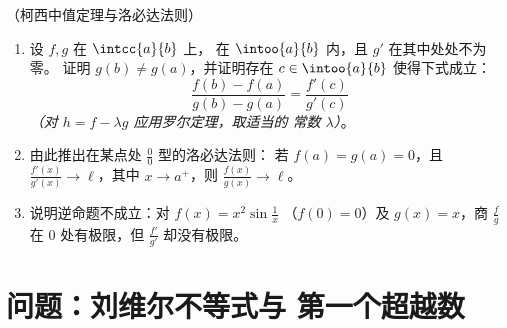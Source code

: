 \begin{exercise}[$\star\star\star$]\label{exo:b1:derivative:12}
（柯西中值定理与洛必达法则）
\begin{enumerate}
  \item 设 $f, g$ 在 $\intcc{a}{b}$ 上，
        在 $\intoo{a}{b}$ 内，且 $g'$ 在其中处处不为零。
        证明 $g(b) \neq g(a)$，并证明存在 $c \in
        \intoo{a}{b}$ 使得下式成立：
        \[
        \frac{f(b) - f(a)}{g(b) - g(a)} = \frac{f'(c)}{g'(c)}
        \]
        \emph{（对 $h = f - \lambda g$ 应用罗尔定理，取适当的
        常数 $\lambda$）}。
  \item 由此推出在某点处 $\frac00$ 型的洛必达法则：
        若 $f(a) = g(a) = 0$，且
        $\frac{f'(x)}{g'(x)} \to \ell$，其中 $x \to a^+$，则
        $\frac{f(x)}{g(x)} \to \ell$。
  \item 说明逆命题不成立：对 $f(x) = x^2\sin\frac1x$
        （$f(0) = 0$）及 $g(x) = x$，商
        $\frac{f}{g}$ 在 $0$ 处有极限，但
        $\frac{f'}{g'}$ 却没有极限。
\end{enumerate}
\end{exercise}

\section{问题：刘维尔不等式与
第一个超越数}

